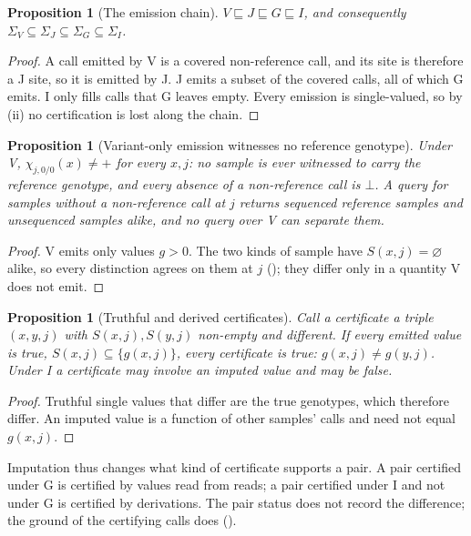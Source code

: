 \documentclass[11pt,twocolumn,a4paper]{article}
\theoremstyle{plain}
\newtheorem{proposition}[theorem]{Proposition}
\theoremstyle{definition}
\theoremstyle{remark}
\newcommand{\Sig}{\Sigma}
\newcommand{\cp}{\mathord{+}}
\newcommand{\cz}{\mathord{\bot}}
\begin{document}
\begin{proposition}[The emission chain]
\label{prop:chain}
$V\sqsubseteq J\sqsubseteq G\sqsubseteq I$, and consequently
$\Sig_V\subseteq\Sig_J\subseteq\Sig_G\subseteq\Sig_I$.
\end{proposition}

\begin{proof}
A call emitted by V is a covered non-reference call, and its site is therefore a
J site, so it is emitted by J. J emits a subset of the covered calls, all of
which G emits. I only fills calls that G leaves empty. Every emission is
single-valued, so by (ii) no certification is lost along the
chain.
\end{proof}

\begin{proposition}[Variant-only emission witnesses no reference genotype]
\label{prop:vonly}
Under V, $\chi_{j,0/0}(x)\ne\cp$ for every $x,j$: no sample is ever witnessed to
carry the reference genotype, and every absence of a non-reference call is
$\cz$. A query for samples without a non-reference call at $j$ returns
sequenced reference samples and unsequenced samples alike, and no query over
V can separate them.
\end{proposition}

\begin{proof}
V emits only values $g>0$. The two kinds of sample have $S(x,j)=\varnothing$
alike, so every distinction agrees on them at $j$
(); they differ only in a quantity V does not emit.
\end{proof}

\begin{proposition}[Truthful and derived certificates]
\label{prop:truthful}
Call a \emph{certificate} a triple $(x,y,j)$ with $S(x,j),S(y,j)$ non-empty and
different. If every emitted value is true, $S(x,j)\subseteq\{g(x,j)\}$, every
certificate is true: $g(x,j)\ne g(y,j)$. Under I a certificate may involve an
imputed value and may be false.
\end{proposition}

\begin{proof}
Truthful single values that differ are the true genotypes, which therefore
differ. An imputed value is a function of other samples' calls and need not
equal $g(x,j)$.
\end{proof}

Imputation thus changes what kind of certificate supports a pair. A pair
certified under G is certified by values read from reads; a pair certified
under I and not under G is certified by derivations. The pair status does not
record the difference; the ground of the certifying calls does
().
\end{document}
